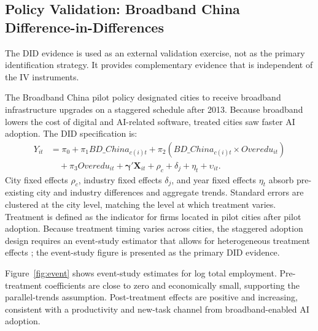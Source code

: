\documentclass[12pt,a4paper]{article}
\theoremstyle{predstyle}
\theoremstyle{plain}
\newcommand{\Overedu}{\mathit{Overedu}}
\begin{document}
\subsection{Policy Validation: Broadband China Difference-in-Differences}
\label{sec:did}

The DID evidence is used as an external validation exercise, not as the primary identification strategy. It provides complementary evidence that is independent of the IV instruments.

The Broadband China pilot policy designated cities to receive broadband infrastructure upgrades on a staggered schedule after 2013. Because broadband lowers the cost of digital and AI-related software, treated cities saw faster AI adoption. The DID specification is:
\begin{equation}
\begin{aligned}
Y_{it}
&= \pi_0 + \pi_1 BD\_China_{c(i)t}
+ \pi_2 (BD\_China_{c(i)t}\times \Overedu_{it}) \\
&\quad + \pi_3 \Overedu_{it}
+ \boldsymbol{\gamma}'\mathbf{X}_{it}
+ \rho_c + \delta_j + \eta_t + \upsilon_{it}.
\end{aligned}
\label{eq:did}
\end{equation}
City fixed effects \(\rho_c\), industry fixed effects \(\delta_j\), and year fixed effects \(\eta_t\) absorb pre-existing city and industry differences and aggregate trends. Standard errors are clustered at the city level, matching the level at which treatment varies. Treatment is defined as the indicator for firms located in pilot cities after pilot adoption. Because treatment timing varies across cities, the staggered adoption design requires an event-study estimator that allows for heterogeneous treatment effects \citep{borusyak2024revisiting}; the event-study figure is presented as the primary DID evidence.

Figure~\ref{fig:event} shows event-study estimates for log total employment. Pre-treatment coefficients are close to zero and economically small, supporting the parallel-trends assumption. Post-treatment effects are positive and increasing, consistent with a productivity and new-task channel from broadband-enabled AI adoption.
\end{document}
